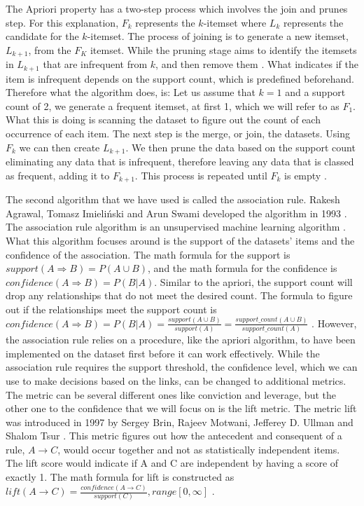 \documentclass[a4paper,10pt]{article}
\begin{document}
The Apriori property has a two-step process which involves the join and prunes step. For this explanation, $F_k$ represents the $k$-itemset where $L_k$ represents the candidate for the $k$-itemset. The process of joining is to generate a new itemset, $L_{k+1}$, from the $F_K$ itemset. While the pruning stage aims to identify the itemsets in $L_{k+1}$ that are infrequent from $k$, and then remove them \cite{jingjingslides}. What indicates if the item is infrequent depends on the support count, which is predefined beforehand. Therefore what the algorithm does, is: Let us assume that $k=1$ and a support count of 2, we generate a frequent itemset, at first 1, which we will refer to as $F_1$. What this is doing is scanning the dataset to figure out the count of each occurrence of each item. The next step is the merge, or join, the datasets. Using $F_k$ we can then create $L_{k+1}$. We then prune the data based on the support count eliminating any data that is infrequent, therefore leaving any data that is classed as frequent, adding it to $F_{k+1}$. This process is repeated until $F_k$ is empty \cite{jingjingslides, han2011data}.

The second algorithm that we have used is called the association rule. Rakesh Agrawal, Tomasz Imieli{\'n}ski and Arun Swami developed the algorithm in 1993 \cite{agrawal1993mining}. The association rule algorithm is an unsupervised machine learning algorithm \cite{geron2019hands}. What this algorithm focuses around is the support of the datasets' items and the confidence of the association. The math formula for the support is $support(A \Rightarrow B) = P(A \cup B)$, and the math formula for the confidence is $confidence(A \Rightarrow B) = P(B|A)$.  Similar to the apriori, the support count will drop any relationships that do not meet the desired count. The formula to figure out if the relationships meet the support count is $confidence(A \Rightarrow B) = P(B|A) = \frac{support(A \cup B)}{support(A)} = \frac{support\_count(A \cup B)}{support\_count(A)}$ \cite{jingjingslides, han2011data}. However, the association rule relies on a procedure, like the apriori algorithm, to have been implemented on the dataset first before it can work effectively. While the association rule requires the support threshold, the confidence level, which we can use to make decisions based on the links, can be changed to additional metrics. The metric can be several different ones like conviction and leverage, but the other one to the confidence that we will focus on is the lift metric. The metric lift was introduced in 1997 by Sergey Brin, Rajeev Motwani, Jefferey D. Ullman and Shalom Tsur \cite{brin1997dynamic}. This metric figures out how the antecedent and consequent of a rule, $A \rightarrow C$, would occur together and not as statistically independent items. The lift score would indicate if A and C are independent by having a score of exactly 1. The math formula for lift is constructed as $lift(A \rightarrow C) = \frac{confidence(A \rightarrow C)}{support(C)}, range[0, \infty]$ \cite{brin1997dynamic, jingjingslides}.
\end{document}
